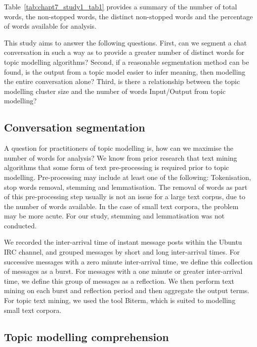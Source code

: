 Table~\ref{tab:chapt7_study1_tab1} provides a summary of the number of total words, the non-stopped words, the distinct non-stopped words and the percentage of words available for analysis. 

This study aims to answer the following questions. First, can we segment a chat conversation in such a way as to provide a greater number of distinct words for topic modelling algorithms? Second, if a reasonable segmentation method can be found, is the output from a topic model easier to infer meaning, then modelling the entire conversation alone? Third, is there a relationship between the topic modelling cluster size and the number of words Input/Output from topic modelling? 

\subsection{Conversation segmentation}

A question for practitioners of topic modelling is, how can we maximise the number of words for analysis? We know from prior research that text mining algorithms that some form of text pre-processing is required prior to topic modelling. Pre-processing may include at least one of the following: Tokenisation, stop words removal, stemming and lemmatisation. The removal of words as part of this pre-processing step usually is not an issue for a large text corpus, due to the number of words available. In the case of small text corpora, the problem may be more acute. For our study, stemming and lemmatisation was not conducted.

We recorded the inter-arrival time of instant message posts within the Ubuntu IRC channel, and grouped messages by short and long inter-arrival times. For successive messages with a zero minute inter-arrival time, we define this collection of messages as a burst. For messages with a one minute or greater inter-arrival time, we define this group of messages as a reflection. We then perform text mining on each burst and reflection period and then aggregate the output terms. For topic text mining, we used the tool Biterm, which is suited to modelling small text corpora.

\subsection{Topic modelling comprehension}

